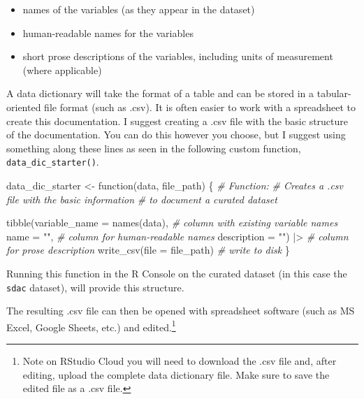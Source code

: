 \documentclass[
  letterpaper,
  DIV=11,
  numbers=noendperiod]{scrreport}
\newenvironment{Shaded}{\begin{snugshade}}{\end{snugshade}}
\newcommand{\AttributeTok}[1]{\textcolor[rgb]{0.00,0.00,0.00}{#1}}
\newcommand{\CommentTok}[1]{\textcolor[rgb]{0.00,0.00,0.00}{\textit{#1}}}
\newcommand{\ControlFlowTok}[1]{\textcolor[rgb]{0.00,0.00,0.00}{#1}}
\newcommand{\FunctionTok}[1]{\textcolor[rgb]{0.00,0.00,0.00}{#1}}
\newcommand{\NormalTok}[1]{\textcolor[rgb]{0.00,0.00,0.00}{#1}}
\newcommand{\OtherTok}[1]{\textcolor[rgb]{0.00,0.00,0.00}{#1}}
\newcommand{\SpecialCharTok}[1]{\textcolor[rgb]{0.00,0.00,0.00}{#1}}
\newcommand{\StringTok}[1]{\textcolor[rgb]{0.00,0.00,0.00}{#1}}
\providecommand{\tightlist}{%
  \setlength{\itemsep}{0pt}\setlength{\parskip}{0pt}}\usepackage{longtable,booktabs,array}
\theoremstyle{definition}
\theoremstyle{remark}
\begin{document}
\begin{itemize}
\tightlist
\item
  names of the variables (as they appear in the dataset)
\item
  human-readable names for the variables
\item
  short prose descriptions of the variables, including units of
  measurement (where applicable)
\end{itemize}

A data dictionary will take the format of a table and can be stored in a
tabular-oriented file format (such as .csv). It is often easier to work
with a spreadsheet to create this documentation. I suggest creating a
.csv file with the basic structure of the documentation. You can do this
however you choose, but I suggest using something along these lines as
seen in the following custom function, \texttt{data\_dic\_starter()}.

\begin{Shaded}
\begin{Highlighting}[]
\NormalTok{data\_dic\_starter }\OtherTok{\textless{}{-}} \ControlFlowTok{function}\NormalTok{(data, file\_path) \{}
  \CommentTok{\# Function:}
  \CommentTok{\# Creates a .csv file with the basic information}
  \CommentTok{\# to document a curated dataset}
  
  \FunctionTok{tibble}\NormalTok{(}\AttributeTok{variable\_name =} \FunctionTok{names}\NormalTok{(data), }\CommentTok{\# column with existing variable names }
       \AttributeTok{name =} \StringTok{""}\NormalTok{, }\CommentTok{\# column for human{-}readable names}
       \AttributeTok{description =} \StringTok{""}\NormalTok{) }\SpecialCharTok{|\textgreater{}} \CommentTok{\# column for prose description}
  \FunctionTok{write\_csv}\NormalTok{(}\AttributeTok{file =}\NormalTok{ file\_path) }\CommentTok{\# write to disk}
\NormalTok{\}}
\end{Highlighting}
\end{Shaded}

Running this function in the R Console on the curated dataset (in this
case the \texttt{sdac} dataset), will provide this structure.

\begin{table}

\end{table}

The resulting .csv file can then be opened with spreadsheet software
(such as MS Excel, Google Sheets, etc.) and edited.\footnote{Note on
  RStudio Cloud you will need to download the .csv file and, after
  editing, upload the complete data dictionary file. Make sure to save
  the edited file as a .csv file.}
\end{document}
